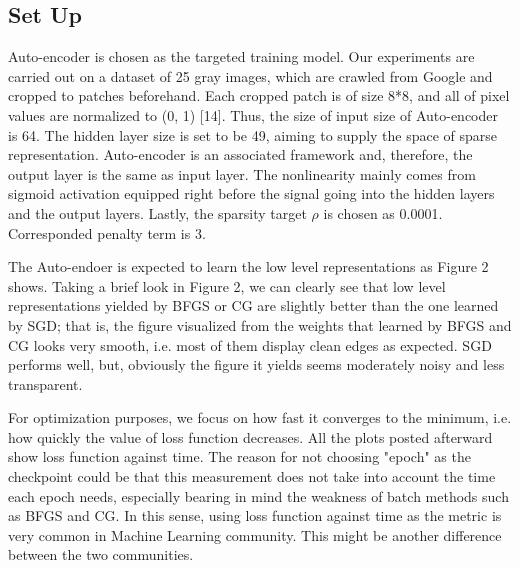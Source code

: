 \documentclass{article} %
\begin{document}
\subsection{Set Up}
Auto-encoder is chosen as the targeted training model. Our experiments are carried out on a dataset of 25 gray images, which are crawled from Google and cropped to patches beforehand. Each cropped patch is of size 8*8, and all of pixel values are normalized to (0, 1) [14]. Thus, the size of input size of Auto-encoder is 64. The hidden layer size is set to be 49, aiming to supply the space of sparse representation. Auto-encoder is an associated framework and, therefore, the output layer is the same as input layer. The nonlinearity mainly comes from sigmoid activation equipped right before the signal going into the hidden layers and the output layers. Lastly, the sparsity target $\rho$ is chosen as 0.0001. Corresponded penalty term is 3.

The Auto-endoer is expected to learn the low level representations as Figure 2 shows. Taking a brief look in Figure 2, we can clearly see that low level representations yielded by BFGS or CG are slightly better than the one learned by SGD; that is, the figure visualized from the weights that learned by BFGS and CG looks very smooth, i.e. most of them display clean edges as expected. SGD performs well, but, obviously the figure it yields seems moderately noisy and less transparent.

For optimization purposes, we focus on how fast it converges to the minimum, i.e. how quickly the value of loss function decreases. All the plots posted afterward show loss function against time. The reason for not choosing "epoch" as the checkpoint could be that this measurement does not take into account the time each epoch needs, especially bearing in mind the weakness of batch methods such as BFGS and CG. In this sense, using loss function against time as the metric is very common in Machine Learning community. This might be another difference between the two communities.
\end{document}
